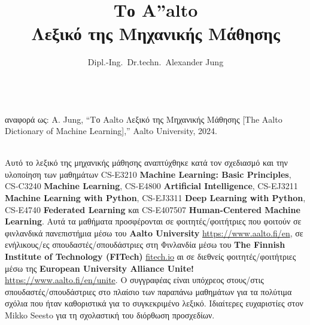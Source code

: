 \documentclass[journal,12pt,onecolumn]{article}
\begin{document}
\title {\vspace*{10mm}
	{\huge {\bf Το {\fontsize{40}{48}\selectfont \textbf{\textsf{A\hspace*{-2mm}''}}}\hspace*{-4mm}alto \\ Λεξικό της Μηχανικής Μάθησης}}  \\[-5mm] 
}

\author{Dipl.-Ing.\ Dr.techn.\ Alexander Jung \\[-6mm]%
}

\maketitle
	\begin{center}
	\\[3mm]
	αναφορά ως: A. Jung, ``Το Aalto Λεξικό της Μηχανικής Μάθησης [The Aalto Dictionary of Machine Learning],'' Aalto University, 2024.
\end{center}

\newpage 
{}\\ 

\noindent Αυτό το λεξικό της μηχανικής μάθησης αναπτύχθηκε κατά τον σχεδιασμό και 
την υλοποίηση των μαθημάτων CS-E3210 {\bf Machine Learning: Basic Principles}, CS-C3240 {\bf Machine Learning}, CS-E4800 {\bf Artificial Intelligence}, CS-EJ3211 {\bf Machine Learning with Python}, CS-EJ3311 {\bf Deep Learning with Python}, CS-E4740 {\bf Federated Learning}
και CS-E407507 {\bf Human-Centered Machine Learning}. Αυτά τα μαθήματα προσφέρονται 
σε φοιτητές/φοιτήτριες που φοιτούν σε φινλανδικά πανεπιστήμια μέσω 
του {\bf Aalto University} \url{https://www.aalto.fi/en}, σε ενήλικους/ες σπουδαστές/σπουδάστριες στη Φινλανδία μέσω του {\bf The Finnish Institute of Technology (FITech)} \url{fitech.io} αι σε διεθνείς φοιτητές/φοιτήτριες μέσω της {\bf European University Alliance Unite!} \url{https://www.aalto.fi/en/unite}. Ο συγγραφέας είναι υπόχρεος στους/στις σπουδαστές/σπουδάστριες στο πλαίσιο των παραπάνω μαθημάτων για τα πολύτιμα σχόλια που ήταν καθοριστικά για το συγκεκριμένο λεξικό. Ιδιαίτερες ευχαριστίες στον Mikko Seesto για τη σχολαστική του διόρθωση προσχεδίων. 



\newpage 


\newpage
\glsaddallunused
\printglossary[nonumberlist]


\newpage
{}
\pagestyle{empty}  %
\printindex  %




\newpage


\end{document}
